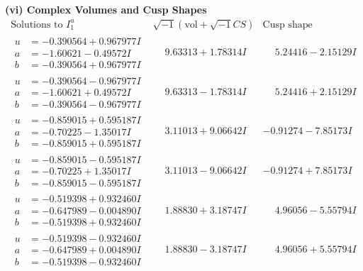 \documentclass[1p]{elsarticle_modified}
\theoremstyle{definition}
\newcommand{\I}{\sqrt{-1}}
\begin{document}
\newpage\flushleft \textbf{(vi) Complex Volumes and Cusp Shapes}
$$\begin{array}{c|c|c}  
\text{Solutions to }I^u_{1}& \I (\text{vol} + \sqrt{-1}CS) & \text{Cusp shape}\\
 \hline 
\begin{aligned}
u &= -0.390564 + 0.967977 I \\
a &= -1.60621 - 0.49572 I \\
b &= -0.390564 + 0.967977 I\end{aligned}
 & \phantom{-}9.63313 + 1.78314 I & \phantom{-}5.24416 - 2.15129 I \\ \hline\begin{aligned}
u &= -0.390564 - 0.967977 I \\
a &= -1.60621 + 0.49572 I \\
b &= -0.390564 - 0.967977 I\end{aligned}
 & \phantom{-}9.63313 - 1.78314 I & \phantom{-}5.24416 + 2.15129 I \\ \hline\begin{aligned}
u &= -0.859015 + 0.595187 I \\
a &= -0.70225 - 1.35017 I \\
b &= -0.859015 + 0.595187 I\end{aligned}
 & \phantom{-}3.11013 + 9.06642 I & -0.91274 - 7.85173 I \\ \hline\begin{aligned}
u &= -0.859015 - 0.595187 I \\
a &= -0.70225 + 1.35017 I \\
b &= -0.859015 - 0.595187 I\end{aligned}
 & \phantom{-}3.11013 - 9.06642 I & -0.91274 + 7.85173 I \\ \hline\begin{aligned}
u &= -0.519398 + 0.932460 I \\
a &= -0.647989 - 0.004890 I \\
b &= -0.519398 + 0.932460 I\end{aligned}
 & \phantom{-}1.88830 + 3.18747 I & \phantom{-}4.96056 - 5.55794 I \\ \hline\begin{aligned}
u &= -0.519398 - 0.932460 I \\
a &= -0.647989 + 0.004890 I \\
b &= -0.519398 - 0.932460 I\end{aligned}
 & \phantom{-}1.88830 - 3.18747 I & \phantom{-}4.96056 + 5.55794 I \\ \hline\begin{aligned}

\end{aligned}
\end{array}$$
\end{document}

